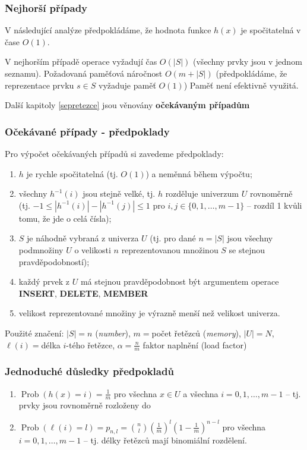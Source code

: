 \documentclass[a4paper,12pt]{article}
\DeclareMathOperator*{\Prob}{Prob}
\begin{document}
\subsubsection{Nejhorší případy}

V následující analýze předpokládáme, že hodnota funkce $
h(x)$ 
je spočitatelná v čase $O(1)$.

V nejhorším případě operace vyžadují čas $
O(|S|)$ 
(všechny prv\-ky jsou v jednom seznamu). \newline 
Požadovaná paměťová náročnost $O(m+|S|)$ 
(předpokládáme, že reprezentace prvku $s\in S$ vyžaduje paměť $
O(1)$)\newline 
Paměť není efektivně využitá.

Další kapitoly \ref{sepretezce} jsou věnovány \textbf{očekávaným případům} 

\subsubsection{Očekávané případy - předpoklady}

Pro výpočet očekávaných případů si zavedeme předpoklady:
\begin{enumerate}
\item
$h$ je rychle spočitatelná (tj. $O(1)$) a neměnná během 
výpočtu;
\item všechny $h^{-1}(i)$ jsou stejně velké, tj.
$h$ rozděluje univerzum $U$ rovnoměrně (tj. 
$-1\le |h^{-1}(i)|-|h^{-1}(j)|\le 1$ pro $i,j\in \{0,1,\dots,m-1\}$ -- rozdíl 1 kvůli tomu, že jde o celá čísla);
\item
$S$ je náhodně vybraná z univerza $U$ (tj. pro dané $n=|S|$ 
jsou všechny podmnoži\-ny $U$ o velikosti $n$ reprezentovanou 
množinou $S$ se stejnou pravděpodobností);
\item
každý prvek z $U$ má stejnou pravděpodobnost být 
argumentem operace {\bf INSERT}, {\bf DELETE}, {\bf MEMBER}
\item
velikost reprezentované množiny je výrazně menší než 
velikost univerza.
\end{enumerate}

Použité značení: $|S|=n$ (\emph{number}), $m=$počet 
řetězců (\emph{memory}), $|U|=N$,\newline 
$\ell (i)=$délka $i$-tého řetězce, $\alpha =\frac nm$ faktor naplnění (load factor)

\subsubsection{Jednoduché důsledky předpokladů}
\begin{enumerate}
\item 
$\Prob(h(x)=i)=\frac 1m$ pro všechna $x\in U$ a všechna 
$i=0,1,\dots,m-1$ -- tj. prvky jsou rovnoměrně rozloženy do  
\item 
$\Prob(\ell (i)=l)=p_{n,l}=\binom nl(\frac 1m)^l(1-\frac 1m)^{n-l}$ 
pro všechna $i=0,1,\dots,m-1$ -- tj. délky řetězců mají binomiální rozdělení.
\end{enumerate}
\end{document}

